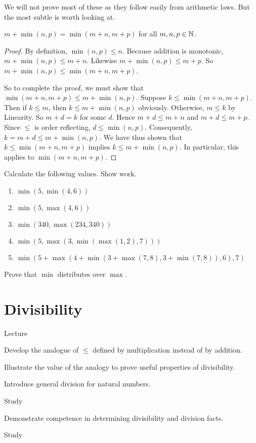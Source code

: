 We will not prove most of these as they follow easily from arithmetic laws. But the most subtle is worth looking at.

\begin{lemma}
$m + \min(n,p) = \min(m+n, m+p)$ for all $m,n,p\in{\mathbb N}$.
\begin{proof}
By definition, $\min(n,p)\leq n$. Because addition is monotonic, $m+\min(n,p) \leq m+n$. Likewise $m+\min(n,p)\leq m+p$. So $m+\min(n,p)\leq \min(m+n,m+p)$.

So to complete the proof, we must show that $\min(m+n,m+p)\leq m+\min(n,p)$. 
Suppose $k\leq \min(m+n,m+p)$. Then if $k\leq m$, then $k\leq m+\min(n,p)$ obviously.
Otherwise, $m\leq k$ by Linearity. So $m+d = k$ for some $d$. Hence $m+d \leq m+n$ and $m+d \leq m+p$. Since $\leq$ is order reflecting, $d\leq \min(n,p)$. Consequently, $k=m+d \leq m+\min(n,p)$. We have thus shown that $k\leq \min(m+n,m+p)$ implies $k\leq m+\min(n,p)$. 
In particular, this applies to $\min(m+n,m+p)$.
\end{proof}
\end{lemma}

\begin{exer}
\begin{exercise}
	\item Calculate the following values. Show work.
  \begin{enumerate}
  \item $\min(5,\min(4,6))$
  \item $\min(5, \max(4,6))$
  \item $\min(340, \max(234, 340))$
  \item $\min(5,\max(3,\min(\max(1,2),7)))$
  \item $\min(5+\max(4 + \min(3 + \max(7,8), 3+ \min(7,8)), 6), 7)$
  \end{enumerate}
  \item Prove that $\min$ distributes over $\max$.
\end{exercise}
\end{exer}

\chapter{Divisibility}

\begin{goals}
	\begin{goal}{Lecture}
		\item Develop the analogue of $\leq$ defined by multiplication instead of by addition.
		\item Illustrate the value of the analogy to prove useful properties of divisibility.
		\item Introduce general division for natural numbers.
	\end{goal}
	
	\begin{goal}{Study}
		\item Demonstrate competence in determining divisibility and division facts.
	\end{goal}{Study}
\end{goals}

